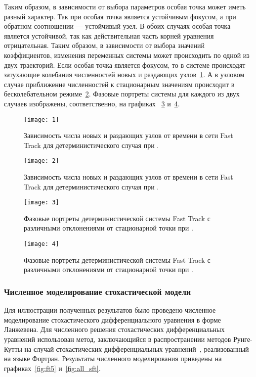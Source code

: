 \documentclass[floatfix,
showkeys,
twocolumn, nofootinbib, superscriptaddress, ]{revtex4-1}
\begin{document}
  Таким образом, в зависимости от выбора параметров особая точка может
  иметь разный характер. Так при  особая точка
  является устойчивым фокусом, а при обратном соотношении ---
  устойчивый узел. В обоих случаях особая точка является устойчивой,
  так как действительная часть корней уравнения отрицательная. Таким
  образом, в зависимости от выбора значений коэффициентов, изменения
  переменных системы может происходить по одной из двух
  траекторий. Если особая точка является фокусом, то в системе
  происходят затухающие колебания численностей новых и раздающих
  узлов~\ref{fig:ft1}. А в узловом случае приближение численностей к
  стационарным значениям происходит в бесколебательном
  режиме~\ref{fig:ft2}. Фазовые портреты системы для каждого из двух
  случаев изображены, соответственно, на графиках ~\ref{fig:ft3}
  и~\ref{fig:ft4}.

\begin{figure}\centering
  \texttt{[image: 1]}
    \caption{Зависимость числа новых и раздающих узлов от времени в
      сети Fast Track для детерминистического случая при 
      .}
  \label{fig:ft1}
\end{figure}

\begin{figure}\centering
  \texttt{[image: 2]}
    \caption{Зависимость числа новых и раздающих узлов от времени в
      сети Fast Track для детерминистического случая при .}
  \label{fig:ft2}
\end{figure}

\begin{figure}\centering
  \texttt{[image: 3]}
    \caption{Фазовые портреты детерминистической системы Fast Track с
      различными отклонениями  от стационарной
      точки при .}
  \label{fig:ft3}
\end{figure}

\begin{figure}\centering
  \texttt{[image: 4]}
    \caption{ Фазовые портреты детерминистической системы Fast Track с
      различными отклонениями  от стационарной
      точки при .}
  \label{fig:ft4}
\end{figure}

  \subsubsection{Численное моделирование стохастической модели}

  Для иллюстрации полученных результатов было проведено численное
  моделирование стохастического дифференциального уравнения в форме
  Ланжевена. Для численного решения стохастических дифференциальных
  уравнений использован метод, заключающийся в распространении методов
  Рунге-Кутты на случай стохастических дифференциальных
  уравнений~\cite{L_lit04, L_lit01}, реализованный на языке
  Фортран. Результаты численного моделирования приведены на
  графиках~\ref{fig:ft5} и~\ref{fig:all_sft}.
\end{document}
